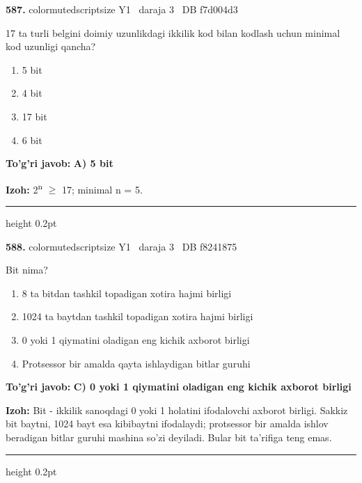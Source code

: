 \documentclass[10pt,a4paper,oneside]{article}
\begin{document}
\noindent\textbf{\color{ink}587.}  {color{muted}scriptsize Y1 \textbullet\ daraja 3 \textbullet\ DB f7d004d3}
\par
17 ta turli belgini doimiy uzunlikdagi ikkilik kod bilan kodlash uchun minimal kod uzunligi qancha?
\begin{enumerate}[label=\Alph*),leftmargin=9mm]
\item 5 bit
\item 4 bit
\item 17 bit
\item 6 bit
\end{enumerate}
\begin{tcolorbox}[enhanced,breakable,colback=teal!4,colframe=teal!50!black,boxrule=0.5pt,arc=1.1mm,left=3mm,right=3mm,top=1.7mm,bottom=1.7mm,before skip=2mm,after skip=2mm]
\textbf{\color{teal}To'g'ri javob:} \textbf{A) 5 bit}
\par\smallskip
\textbf{Izoh:} 2\textsuperscript{n} \ensuremath{\geq} 17; minimal n = 5.
\end{tcolorbox}
\vspace{2mm}\hrule height 0.2pt \vspace{3mm}

\noindent\textbf{\color{ink}588.}  {color{muted}scriptsize Y1 \textbullet\ daraja 3 \textbullet\ DB f8241875}
\par
Bit nima?
\begin{enumerate}[label=\Alph*),leftmargin=9mm]
\item 8 ta bitdan tashkil topadigan xotira hajmi birligi
\item 1024 ta baytdan tashkil topadigan xotira hajmi birligi
\item 0 yoki 1 qiymatini oladigan eng kichik axborot birligi
\item Protsessor bir amalda qayta ishlaydigan bitlar guruhi
\end{enumerate}
\begin{tcolorbox}[enhanced,breakable,colback=teal!4,colframe=teal!50!black,boxrule=0.5pt,arc=1.1mm,left=3mm,right=3mm,top=1.7mm,bottom=1.7mm,before skip=2mm,after skip=2mm]
\textbf{\color{teal}To'g'ri javob:} \textbf{C) 0 yoki 1 qiymatini oladigan eng kichik axborot birligi}
\par\smallskip
\textbf{Izoh:} Bit - ikkilik sanoqdagi 0 yoki 1 holatini ifodalovchi axborot birligi. Sakkiz bit baytni, 1024 bayt esa kibibaytni ifodalaydi; protsessor bir amalda ishlov beradigan bitlar guruhi mashina so'zi deyiladi. Bular bit ta'rifiga teng emas.
\end{tcolorbox}
\vspace{2mm}\hrule height 0.2pt \vspace{3mm}
\end{document}

